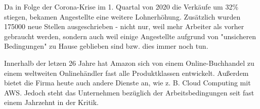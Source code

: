 Da in Folge der Corona-Krise im 1. Quartal von 2020 die Verkäufe um 32\% stiegen, bekamen Angestellte eine weitere Lohnerhöhung. Zusätzlich wurden 175000 neue Stellen ausgeschrieben - nicht nur, weil mehr Arbeiter als vorher gebraucht werden, sondern auch weil einige Angestellte aufgrund von "unsicheren Bedingungen" zu Hause geblieben sind bzw. dies immer noch tun\cite{Theweek}.

Innerhalb der letzen 26 Jahre hat Amazon sich von einem Online-Buchhandel zu einem weltweiten Onlinehändler fast alle Produktklassen entwickelt. Außerdem bietet die Firma heute auch andere Dienste an, wie z. B. Cloud Computing mit \ac{AWS}. Jedoch steht das Unternehmen bezüglich der Arbeitsbedingungen seit fast einem Jahrzehnt in der Kritik.


